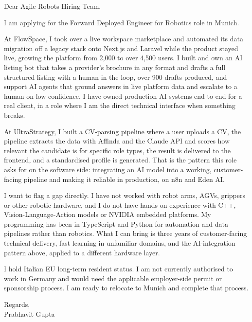 \documentclass[a4paper,11pt]{article}
\begin{document}
Dear Agile Robots Hiring Team,

I am applying for the Forward Deployed Engineer for Robotics role in Munich.

At FlowSpace, I took over a live workspace marketplace and automated its data migration off a legacy stack onto Next.js and Laravel while the product stayed live, growing the platform from 2,000 to over 4,500 users. I built and own an AI listing bot that takes a provider's brochure in any format and drafts a full structured listing with a human in the loop, over 900 drafts produced, and support AI agents that ground answers in live platform data and escalate to a human on low confidence. I have owned production AI systems end to end for a real client, in a role where I am the direct technical interface when something breaks.

At UltraStrategy, I built a CV-parsing pipeline where a user uploads a CV, the pipeline extracts the data with Affinda and the Claude API and scores how relevant the candidate is for specific role types, the result is delivered to the frontend, and a standardised profile is generated. That is the pattern this role asks for on the software side: integrating an AI model into a working, customer-facing pipeline and making it reliable in production, on n8n and Eden AI.

I want to flag a gap directly. I have not worked with robot arms, AGVs, grippers or other robotic hardware, and I do not have hands-on experience with C++, Vision-Language-Action models or NVIDIA embedded platforms. My programming has been in TypeScript and Python for automation and data pipelines rather than robotics. What I can bring is three years of customer-facing technical delivery, fast learning in unfamiliar domains, and the AI-integration pattern above, applied to a different hardware layer.

I hold Italian EU long-term resident status. I am not currently authorised to work in Germany and would need the applicable employer-side permit or sponsorship process. I am ready to relocate to Munich and complete that process.

Regards,\\
Prabhavit Gupta
\end{document}
